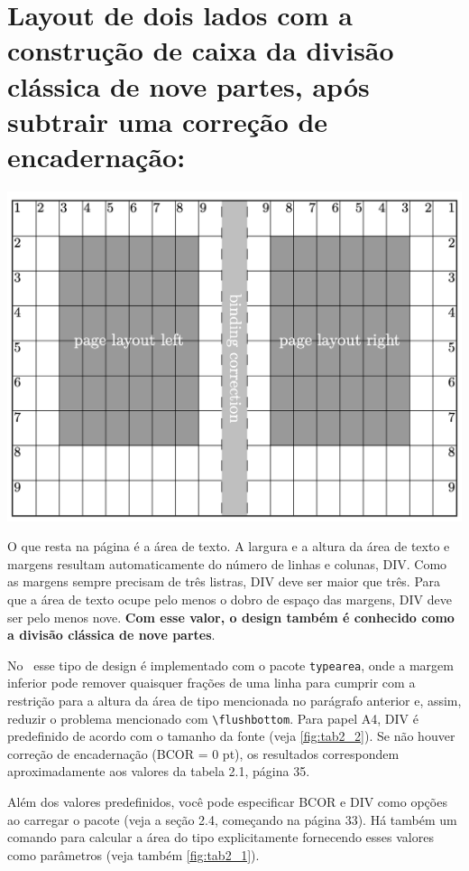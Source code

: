 \section*{Layout de dois lados com a construção de caixa da divisão clássica de nove partes, após subtrair uma correção de encadernação:
}
\includegraphics[scale=0.8]{imagens/imagem02.png}

O que resta na página é a área de texto. A largura e a altura da área de texto e margens resultam automaticamente do número de linhas e colunas, DIV. Como as margens sempre precisam de três listras, DIV deve ser maior que três. Para que a área de texto ocupe pelo menos o dobro de espaço das margens, DIV deve ser pelo menos nove. \textbf{Com esse valor, o design também é conhecido como a divisão clássica de nove partes}.

No \KOMAScript\ esse tipo de design é implementado com o pacote \texttt{typearea}, onde a margem inferior pode remover quaisquer frações de uma linha para cumprir com a restrição para a altura da área de tipo mencionada no parágrafo anterior e, assim, reduzir o problema mencionado com \verb|\flushbottom|. Para papel A4, DIV é predefinido de acordo com o tamanho da fonte (veja \ref{fig:tab2_2}). Se não houver correção de encadernação (BCOR = 0 pt), os resultados correspondem aproximadamente aos valores da tabela 2.1, página 35.

Além dos valores predefinidos, você pode especificar BCOR e DIV como opções ao carregar o pacote (veja a seção 2.4, começando na página 33). Há também um comando para calcular a área do tipo explicitamente fornecendo esses valores como parâmetros (veja também \ref{fig:tab2_1}).

